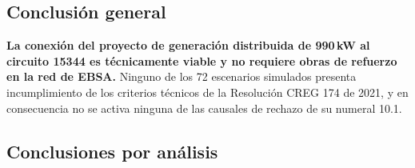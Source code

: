 \documentclass[11pt,a4paper]{article}
\begin{document}
\subsection*{Conclusi\'on general}

\textbf{La conexi\'on del proyecto de generaci\'on distribuida de 990\,kW al
circuito 15344 es t\'ecnicamente viable y no requiere obras de refuerzo en la red
de EBSA.} Ninguno de los 72 escenarios simulados presenta incumplimiento de los
criterios t\'ecnicos de la Resoluci\'on CREG 174 de 2021, y en consecuencia no se
activa ninguna de las causales de rechazo de su numeral 10.1.

\subsection*{Conclusiones por an\'alisis}
\end{document}
